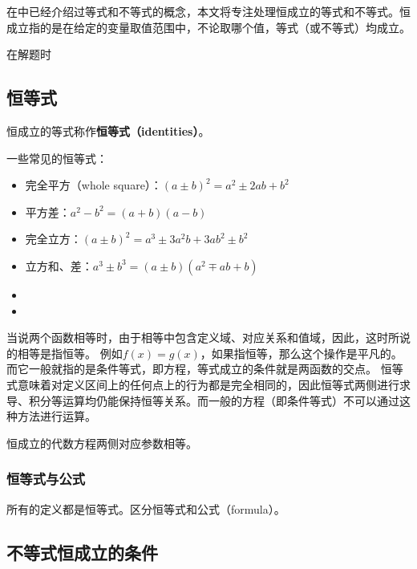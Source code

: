 

\begin{issues}
\issueDraft
\end{issues}

在中已经介绍过等式和不等式的概念，本文将专注处理恒成立的等式和不等式。恒成立指的是在给定的变量取值范围中，不论取哪个值，等式（或不等式）均成立。

在解题时

\subsection{恒等式}\label{sub_HsIden_1}

恒成立的等式称作\textbf{恒等式（identities）}。

一些常见的恒等式：
\begin{itemize}
\item 完全平方（whole square）：$(a\pm b)^2=a^2\pm2ab+b^2$
\item 平方差：$a^2-b^2=(a+b)(a-b)$
\item 完全立方：$(a\pm b)^2=a^3\pm 3a^2b+3ab^2\pm b^2$
\item 立方和、差：$a^3\pm b^3=(a\pm b)(a^2\mp ab+b)$
\item {}
\item {}
\end{itemize}

当说两个函数相等时，由于相等中包含定义域、对应关系和值域，因此，这时所说的相等是指恒等。
例如$f(x)=g(x)$，如果指恒等，那么这个操作是平凡的。而它一般就指的是条件等式，即方程，等式成立的条件就是两函数的交点。
恒等式意味着对定义区间上的任何点上的行为都是完全相同的，因此恒等式两侧进行求导、积分等运算均仍能保持恒等关系。而一般的方程（即条件等式）不可以通过这种方法进行运算。


恒成立的代数方程两侧对应参数相等。
\subsubsection{恒等式与公式}

所有的定义都是恒等式。区分恒等式和公式（formula）。

\subsection{不等式恒成立的条件}

